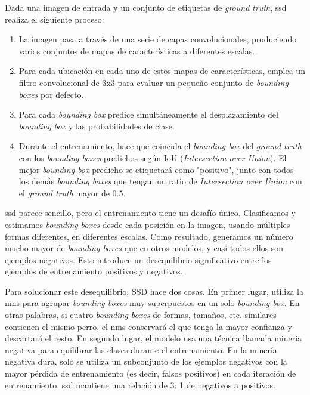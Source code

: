 Dada una imagen de entrada y un conjunto de etiquetas de \textit{ground truth}, \acrshort{ssd} realiza el siguiente proceso:
\begin{enumerate}
\item La imagen pasa a través de una serie de capas convolucionales, produciendo varios conjuntos de mapas de características a diferentes escalas.
\item Para cada ubicación en cada uno de estos mapas de características, emplea un filtro convolucional de 3x3 para evaluar un pequeño conjunto de \textit{bounding boxes} por defecto.
\item Para cada \textit{bounding box} predice simultáneamente el desplazamiento del \textit{bounding box} y las probabilidades de clase.
\item Durante el entrenamiento, hace que coincida el \textit{bounding box} del \textit{ground truth} con los \textit{bounding boxes} predichos según IoU (\textit{Intersection over Union}). El mejor \textit{bounding box} predicho se etiquetará como "positivo", junto con todos los demás \textit{bounding boxes} que tengan un ratio de \textit{Intersection over Union} con el \textit{ground truth} mayor de 0.5.
\end{enumerate}

\acrshort{ssd} parece sencillo, pero el entrenamiento tiene un desafío único. Clasificamos y estimamos \textit{bounding boxes} desde cada posición en la imagen, usando múltiples formas diferentes, en diferentes escalas. Como resultado, generamos un número mucho mayor de \textit{bounding boxes} que en otros modelos, y casi todos ellos son ejemplos negativos. Esto introduce un desequilibrio significativo entre los ejemplos de entrenamiento positivos y negativos.

Para solucionar este desequilibrio, SSD hace dos cosas. En primer lugar, utiliza la \acrfull{nms} para agrupar \textit{bounding boxes} muy superpuestos en un solo \textit{bounding box}. En otras palabras, si cuatro \textit{bounding boxes} de formas, tamaños, etc. similares contienen el mismo perro, el \acrshort{nms} conservará el que tenga la mayor confianza y descartará el resto. En segundo lugar, el modelo usa una técnica llamada minería negativa para equilibrar las clases durante el entrenamiento. En la minería negativa dura, solo se utiliza un subconjunto de los ejemplos negativos con la mayor pérdida de entrenamiento (es decir, falsos positivos) en cada iteración de entrenamiento. \acrshort{ssd} mantiene una relación de 3: 1 de negativos a positivos.


